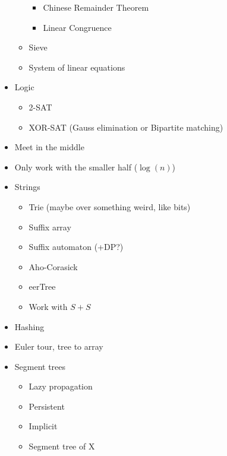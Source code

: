 \documentclass[9pt,a4paper,twocolumn,landscape,oneside]{amsart}
\begin{document}
\begin{itemize}
\begin{itemize}
\begin{itemize}
                                \item Chinese Remainder Theorem
                                \item Linear Congruence
                            \end{itemize}
                        \item Sieve
                        \item System of linear equations
                    \end{itemize}
                \item Logic
                    \begin{itemize}
                        \item 2-SAT
                        \item XOR-SAT (Gauss elimination or Bipartite matching)
                    \end{itemize}
                \item Meet in the middle
                \item Only work with the smaller half ($\log(n)$)
                \item Strings
                    \begin{itemize}
                        \item Trie (maybe over something weird, like bits)
                        \item Suffix array
                        \item Suffix automaton (+DP?)
                        \item Aho-Corasick
                        \item eerTree
                        \item Work with $S+S$
                    \end{itemize}
                \item Hashing
                \item Euler tour, tree to array
                \item Segment trees
                    \begin{itemize}
                        \item Lazy propagation
                        \item Persistent
                        \item Implicit
                        \item Segment tree of X
                    \end{itemize}

\end{itemize}
\end{document}
